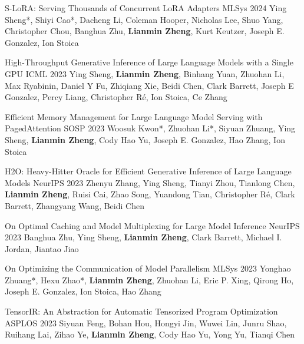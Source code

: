 
\begin{cventries}
	
	\cventry
	{}
	{S-LoRA: Serving Thousands of Concurrent LoRA Adapters} %
	{MLSys 2024} %
	{} %
	{Ying Sheng*, Shiyi Cao*, Dacheng Li, Coleman Hooper, Nicholas Lee, Shuo Yang, Christopher Chou, Banghua Zhu, \textbf{Lianmin Zheng}, Kurt Keutzer, Joseph E. Gonzalez, Ion Stoica}

	\cventry
	{}
	{High-Throughput Generative Inference of Large Language Models with a Single GPU} %
	{ICML 2023} %
	{} %
	{Ying Sheng, \textbf{Lianmin Zheng}, Binhang Yuan, Zhuohan Li, Max Ryabinin, Daniel Y Fu, Zhiqiang Xie, Beidi Chen, Clark Barrett, Joseph E Gonzalez, Percy Liang, Christopher Ré, Ion Stoica, Ce Zhang}

	\cventry
	{}
	{Efficient Memory Management for Large Language Model Serving with PagedAttention} %
	{SOSP 2023} %
	{} %
	{Woosuk Kwon*, Zhuohan Li*, Siyuan Zhuang, Ying Sheng, \textbf{Lianmin Zheng}, Cody Hao Yu, Joseph E. Gonzalez, Hao Zhang, Ion Stoica}
	
	\cventry
	{}
	{H2O: Heavy-Hitter Oracle for Efficient Generative Inference of Large Language Models} %
	{NeurIPS 2023} %
	{} %
	{Zhenyu Zhang, Ying Sheng, Tianyi Zhou, Tianlong Chen, \textbf{Lianmin Zheng}, Ruisi Cai, Zhao Song, Yuandong Tian, Christopher Ré, Clark Barrett, Zhangyang Wang, Beidi Chen}
	
	\cventry
	{}
	{On Optimal Caching and Model Multiplexing for Large Model Inference} %
	{NeurIPS 2023} %
	{} %
	{Banghua Zhu, Ying Sheng, \textbf{Lianmin Zheng}, Clark Barrett, Michael I. Jordan, Jiantao Jiao}
	
	\cventry
	{}
	{On Optimizing the Communication of Model Parallelism} %
	{MLSys 2023} %
	{} %
	{Yonghao Zhuang*, Hexu Zhao*, \textbf{Lianmin Zheng}, Zhuohan Li, Eric P. Xing, Qirong Ho, Joseph E. Gonzalez, Ion Stoica, Hao Zhang}
	
	\cventry
	{}
	{TensorIR: An Abstraction for Automatic Tensorized Program Optimization} %
	{ASPLOS 2023} %
	{} %
	{Siyuan Feng, Bohan Hou, Hongyi Jin, Wuwei Lin, Junru Shao, Ruihang Lai, Zihao Ye, \textbf{Lianmin Zheng}, Cody Hao Yu, Yong Yu, Tianqi Chen}
	

\end{cventries}
